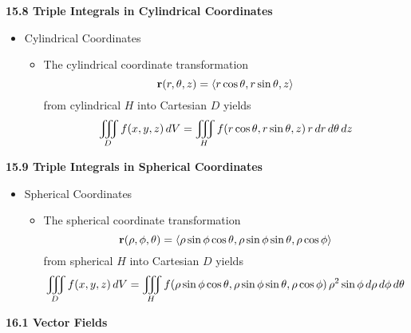
\hruler

\centerline{\bf 15.8 Triple Integrals in Cylindrical Coordinates}
  
  \begin{itemize}
  
  \item Cylindrical Coordinates
    \begin{itemize}
    \item The cylindrical coordinate transformation \[\mathbf{r}(r,\theta,z) = \left<r\cos\theta, r\sin\theta, z\right>\] from cylindrical $H$ into Cartesian $D$ yields \[\iiint\limits_D f(x,y,z)\,d{V} = \iiint\limits_H f(r\cos\theta,r\sin\theta,z)\,r\,d{r}\,d{\theta}\,d{z}\]
    \end{itemize}
      
  
  
  \end{itemize}


\hruler

\centerline{\bf 15.9 Triple Integrals in Spherical Coordinates}

  \begin{itemize}
  
  \item Spherical Coordinates
    \begin{itemize}
    \item The spherical coordinate transformation \[\mathbf{r}(\rho,\phi,\theta)=\left<\rho\sin\phi\cos\theta, \rho\sin\phi\sin\theta, \rho\cos\phi\right>\] from spherical $H$ into Cartesian $D$ yields \[\iiint\limits_D f(x,y,z)\, dV = \iiint\limits_H f(\rho\sin\phi\cos\theta,\rho\sin\phi\sin\theta,\rho\cos\phi) \,\rho^2\sin\phi\,d{\rho}\,d{\phi}\,d{\theta} \]
    \end{itemize}
  \end{itemize}
  
\newpage

\centerline{\bf 16.1 Vector Fields}

